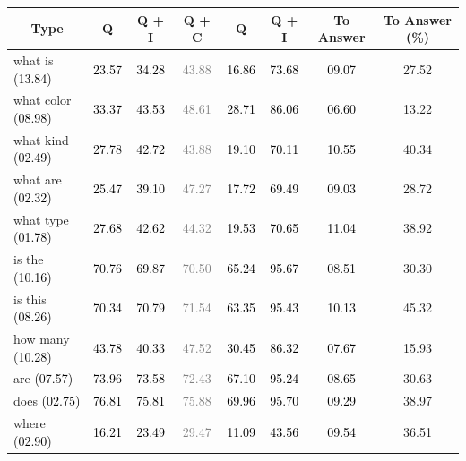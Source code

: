 \begin{table}[h]
\begin{center}
\begin{tabular}{@{} l  c  c  c  c c c c@{}  }
\multicolumn{1}{c}{Type}  & Q & Q + I & Q + C & Q & Q + I & To Answer & To Answer (\%)\\
\midrule
what is \textcolor{black}{(13.84)} & \textcolor{black}{23.57} & \textcolor{black}{34.28} & \textcolor{gray}{43.88} & \textcolor{black}{16.86} & \textcolor{black}{73.68} &\textcolor{black}{09.07} & 27.52\\
what color \textcolor{black}{(08.98)} & \textcolor{black}{33.37} & \textcolor{black}{43.53} & \textcolor{gray}{48.61} & \textcolor{black}{28.71} & \textcolor{black}{86.06} &\textcolor{black}{06.60} & 13.22\\
what kind \textcolor{black}{(02.49)} & \textcolor{black}{27.78} & \textcolor{black}{42.72} & \textcolor{gray}{43.88} & \textcolor{black}{19.10} & \textcolor{black}{70.11} &\textcolor{black}{10.55} & 40.34\\
what are \textcolor{black}{(02.32)} & \textcolor{black}{25.47} & \textcolor{black}{39.10} & \textcolor{gray}{47.27} & \textcolor{black}{17.72} & \textcolor{black}{69.49} &\textcolor{black}{09.03} & 28.72\\
what type \textcolor{black}{(01.78)} & \textcolor{black}{27.68} & \textcolor{black}{42.62} & \textcolor{gray}{44.32} & \textcolor{black}{19.53} & \textcolor{black}{70.65} &\textcolor{black}{11.04} & 38.92\\
is the \textcolor{black}{(10.16)} & \textcolor{black}{70.76} & \textcolor{black}{69.87} & \textcolor{gray}{70.50} & \textcolor{black}{65.24} & \textcolor{black}{95.67} &\textcolor{black}{08.51} & 30.30\\
is this \textcolor{black}{(08.26)} & \textcolor{black}{70.34} & \textcolor{black}{70.79} & \textcolor{gray}{71.54} & \textcolor{black}{63.35} & \textcolor{black}{95.43} &\textcolor{black}{10.13} & 45.32\\
how many \textcolor{black}{(10.28)} & \textcolor{black}{43.78} & \textcolor{black}{40.33} & \textcolor{gray}{47.52} & \textcolor{black}{30.45} & \textcolor{black}{86.32} &\textcolor{black}{07.67}& 15.93 \\
are \textcolor{black}{(07.57)} & \textcolor{black}{73.96} & \textcolor{black}{73.58} & \textcolor{gray}{72.43} & \textcolor{black}{67.10} & \textcolor{black}{95.24} &\textcolor{black}{08.65} & 30.63\\
does \textcolor{black}{(02.75)} & \textcolor{black}{76.81} & \textcolor{black}{75.81} & \textcolor{gray}{75.88} & \textcolor{black}{69.96} & \textcolor{black}{95.70} &\textcolor{black}{09.29} & 38.97\\
where \textcolor{black}{(02.90)} & \textcolor{black}{16.21} & \textcolor{black}{23.49} & \textcolor{gray}{29.47} & \textcolor{black}{11.09} & \textcolor{black}{43.56} &\textcolor{black}{09.54} & 36.51\\

\end{tabular}
\end{center}
\end{table}
